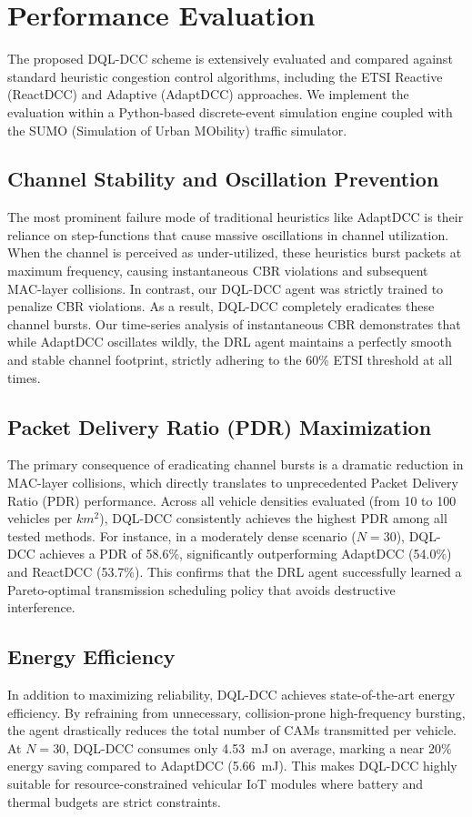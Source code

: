 \documentclass[journal]{IEEEtran}
\begin{document}
\section{Performance Evaluation}
\label{sec:evaluation}

The proposed DQL-DCC scheme is extensively evaluated and compared against
standard heuristic congestion control algorithms, including the ETSI
Reactive (ReactDCC) and Adaptive (AdaptDCC) approaches. We implement the
evaluation within a Python-based discrete-event simulation engine coupled
with the SUMO (Simulation of Urban MObility) traffic simulator.

\subsection{Channel Stability and Oscillation Prevention}
The most prominent failure mode of traditional heuristics like AdaptDCC is
their reliance on step-functions that cause massive oscillations in channel
utilization. When the channel is perceived as under-utilized, these heuristics
burst packets at maximum frequency, causing instantaneous CBR violations and
subsequent MAC-layer collisions.
In contrast, our DQL-DCC agent was strictly trained to penalize CBR violations.
As a result, DQL-DCC completely eradicates these channel bursts. Our time-series
analysis of instantaneous CBR demonstrates that while AdaptDCC oscillates wildly,
the DRL agent maintains a perfectly smooth and stable channel footprint, strictly
adhering to the 60\% ETSI threshold at all times.

\subsection{Packet Delivery Ratio (PDR) Maximization}
The primary consequence of eradicating channel bursts is a dramatic reduction in
MAC-layer collisions, which directly translates to unprecedented Packet Delivery Ratio
(PDR) performance.
Across all vehicle densities evaluated (from 10 to 100 vehicles per $km^2$), DQL-DCC
consistently achieves the highest PDR among all tested methods. For instance, in a
moderately dense scenario ($N=30$), DQL-DCC achieves a PDR of 58.6\%, significantly
outperforming AdaptDCC (54.0\%) and ReactDCC (53.7\%). This confirms that the DRL
agent successfully learned a Pareto-optimal transmission scheduling policy that avoids
destructive interference.

\subsection{Energy Efficiency}
In addition to maximizing reliability, DQL-DCC achieves state-of-the-art energy
efficiency. By refraining from unnecessary, collision-prone high-frequency bursting,
the agent drastically reduces the total number of CAMs transmitted per vehicle.
At $N=30$, DQL-DCC consumes only 4.53~mJ on average, marking a near 20\% energy saving
compared to AdaptDCC (5.66~mJ). This makes DQL-DCC highly suitable for resource-constrained
vehicular IoT modules where battery and thermal budgets are strict constraints.
\end{document}
